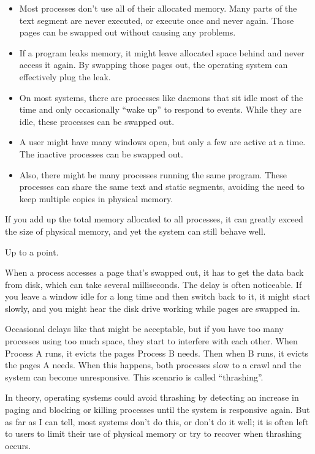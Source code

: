 \documentclass[12pt]{book}
\begin{document}
\begin{itemize}

\item Most processes don't use all of their allocated memory.  Many
  parts of the text segment are never executed, or execute once and
  never again.  Those pages can be swapped out without causing any
  problems.

\item If a program leaks memory, it might leave allocated space behind
  and never access it again.  By swapping those pages out, the
  operating system can effectively plug the leak.

\item On most systems, there are processes like daemons that sit idle
  most of the time and only occasionally ``wake up'' to respond to
  events.  While they are idle, these processes can be swapped out.

\item A user might have many windows open, but only a few are active
  at a time.  The inactive processes can be swapped out.

\item Also, there might be many processes running the same program.
  These processes can share the same text and static segments, avoiding the need to keep multiple copies in physical memory.

\end{itemize}

If you add up the total memory allocated to all processes, it can
greatly exceed the size of physical memory, and yet the system can
still behave well.

Up to a point.

When a process accesses a page that's swapped out, it has to get the
data back from disk, which can take several milliseconds.  The
delay is often noticeable.  If you leave a window idle for a long
time and then switch back to it, it might start slowly,
and you might hear the disk drive working while pages are
swapped in.  

Occasional delays like that might be acceptable, but if you have too
many processes using too much space, they start to interfere with each
other.  When Process A runs, it evicts the pages Process B needs.
Then when B runs, it evicts the pages A needs.  When this happens,
both processes slow to a crawl and the system can become unresponsive.
This scenario is called ``thrashing''.

In theory, operating systems could avoid thrashing by detecting an
increase in paging and blocking or killing processes until the system
is responsive again.  But as far as I can tell, most systems don't do
this, or don't do it well; it is often left to users to limit their
use of physical memory or try to recover when thrashing occurs.
\end{document}
